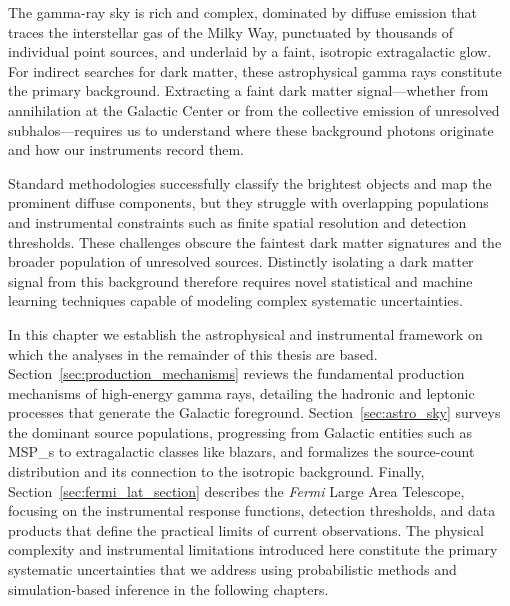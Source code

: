 
The gamma-ray sky is rich and complex, dominated by diffuse emission that traces the interstellar gas of the Milky Way, punctuated by thousands of individual point sources, and underlaid by a faint, isotropic extragalactic glow.
For indirect searches for dark matter, these astrophysical gamma rays constitute the primary background.
Extracting a faint dark matter signal---whether from annihilation at the Galactic Center or from the collective emission of unresolved subhalos---requires us to understand where these background photons originate and how our instruments record them.

Standard methodologies successfully classify the brightest objects and map the prominent diffuse components, but they struggle with overlapping populations and instrumental constraints such as finite spatial resolution and detection thresholds.
These challenges obscure the faintest dark matter signatures and the broader population of unresolved sources.
Distinctly isolating a dark matter signal from this background therefore requires novel statistical and machine learning techniques capable of modeling complex systematic uncertainties.

In this chapter we establish the astrophysical and instrumental framework on which the analyses in the remainder of this thesis are based.
Section~\ref{sec:production_mechanisms} reviews the fundamental production mechanisms of high-energy gamma rays, detailing the hadronic and leptonic processes that generate the Galactic foreground.
Section~\ref{sec:astro_sky} surveys the dominant source populations, progressing from Galactic entities such as \glspl{MSP_} to extragalactic classes like blazars, and formalizes the source-count distribution and its connection to the isotropic background.
Finally, Section~\ref{sec:fermi_lat_section} describes the \textit{Fermi} Large Area Telescope, focusing on the instrumental response functions, detection thresholds, and data products that define the practical limits of current observations.
The physical complexity and instrumental limitations introduced here constitute the primary systematic uncertainties that we address using probabilistic methods and simulation-based inference in the following chapters.
